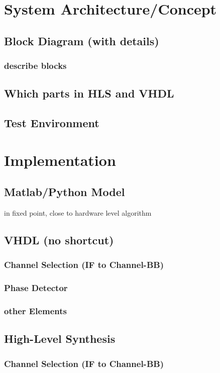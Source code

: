 \chapter{System Architecture/Concept}
  \section{Block Diagram (with details)}
    \subsection{describe blocks}
  \section{Which parts in HLS and VHDL}
  \section{Test Environment}

\chapter{Implementation}
  \section{Matlab/Python Model}
  in fixed point, close to hardware level algorithm

  \section{VHDL (no shortcut)}
    \subsection{Channel Selection (IF to Channel-BB)}
    \subsection{Phase Detector}
    \subsection{other Elements}

  \section{High-Level Synthesis}
    \subsection{Channel Selection (IF to Channel-BB)}
